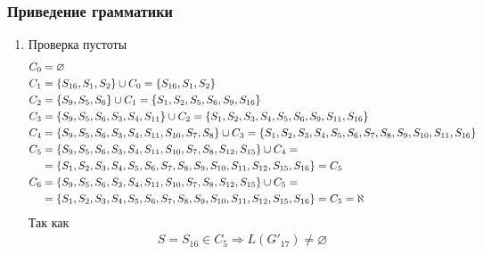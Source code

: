 \subsubsection{Приведение грамматики}
\begin{enumerate}
	\item Проверка пустоты
	      \begin{align*}
		      C_0 & = \varnothing                                                                                                                                               \\
		      C_1 & = \left\{S_{16}, S_1, S_2\right\} \cup C_0 = \left\{S_{16}, S_1, S_2\right\}                                                                                                  \\
		      C_2 & = \left\{S_9, S_5, S_6\right\} \cup C_1 = \left\{S_1, S_2, S_5, S_6, S_9, S_{16}\right\}                                                                                      \\
		      C_3 & = \left\{S_9, S_5, S_6, S_3, S_4, S_{11}\right\} \cup C_2 = \left\{S_1, S_2, S_3, S_4, S_5, S_6, S_9, S_{11}, S_{16}\right\}                                                  \\
		      C_4 & = \left\{S_9, S_5, S_6, S_3, S_4, S_{11}, S_{10}, S_7, S_8\right\} \cup C_3 = \left\{S_1, S_2, S_3, S_4, S_5, S_6, S_7, S_8, S_9, S_{10}, S_{11}, S_{16}\right\}              \\
		      C_5 & = \left\{S_9, S_5, S_6, S_3, S_4, S_{11}, S_{10}, S_7, S_8, S_{12}, S_{15}\right\} \cup C_4 =                                                                        \\
		          & = \left\{S_1, S_2, S_3, S_4, S_5, S_6, S_7, S_8, S_9, S_{10}, S_{11}, S_{12}, S_{15}, S_{16}\right\} = C_5                                                           \\
		      C_6 & = \left\{S_9, S_5, S_6, S_3, S_4, S_{11}, S_{10}, S_7, S_8, S_{12}, S_{15}\right\} \cup C_5 =                                                                        \\
		          & = \left\{S_1, S_2, S_3, S_4, S_5, S_6, S_7, S_8, S_9, S_{10}, S_{11}, S_{12}, S_{15}, S_{16}\right\} = C_5                                                  = \aleph
	      \end{align*}
	      Так как
	      \begin{align}
		      S = S_{16} \in C_5 \Longrightarrow L(G'_{17}) \not= \varnothing
	      \end{align}
\end{enumerate}
